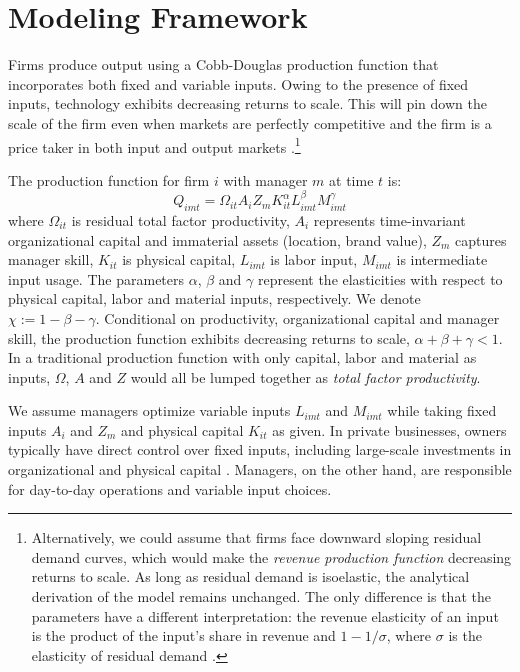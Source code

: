 \documentclass[11pt,a4paper]{article}
\begin{document}
\section{Modeling Framework}
Firms produce output using a Cobb-Douglas production function that incorporates both fixed and variable inputs. Owing to the presence of fixed inputs, technology exhibits decreasing returns to scale. This will pin down the scale of the firm even when markets are perfectly competitive and the firm is a price taker in both input and output markets \citep{AtkesonKehoe2005JPE,McGrattan2012RED}.\footnote{Alternatively, we could assume that firms face downward sloping residual demand curves, which would make the \emph{revenue production function} decreasing returns to scale. As long as residual demand is isoelastic, the analytical derivation of the model remains unchanged. The only difference is that the parameters have a different interpretation: the revenue elasticity of an input is the product of the input's share in revenue and $1-1/\sigma$, where $\sigma$ is the elasticity of residual demand \citep{DeLoecker2011Econometrica}.}

The production function for firm $i$ with manager $m$ at time $t$ is:
\begin{equation}
Q_{imt} = \Omega_{it}A_i Z_{m}  K_{it}^\alpha L_{imt}^{\beta} M_{imt}^{\gamma}
\end{equation}
where $\Omega_{it}$ is residual total factor productivity, $A_i$ represents time-invariant organizational capital and immaterial assets (location, brand value), $Z_m$ captures manager skill, $K_{it}$ is physical capital, $L_{imt}$ is labor input, $M_{imt}$ is intermediate input usage. The parameters $\alpha$, $\beta$ and $\gamma$ represent the elasticities with respect to physical capital, labor and material inputs, respectively. We denote $\chi := 1 - \beta - \gamma$. Conditional on productivity, organizational capital and manager skill, the production function exhibits decreasing returns to scale, $\alpha + \beta + \gamma < 1$. In a traditional production function with only capital, labor and material as inputs, $\Omega$, $A$ and $Z$ would all be lumped together as \emph{total factor productivity}.

We assume managers optimize variable inputs $L_{imt}$ and $M_{imt}$ while taking fixed inputs $A_{i}$ and $Z_m$ and physical capital $K_{it}$ as given. In private businesses, owners typically have direct control over fixed inputs, including large-scale investments in organizational and physical capital \citep{Navaretti2010EFIGE}. Managers, on the other hand, are responsible for day-to-day operations and variable input choices.
\end{document}
